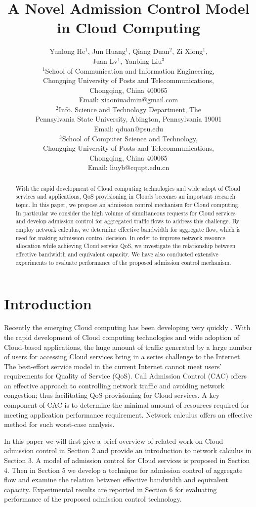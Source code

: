 \documentclass[a4paper]{article}
\title{A Novel Admission Control Model in Cloud Computing}
\author{Yunlong He$^1$, Jun Huang$^1$, Qiang Duan$^2$, Zi Xiong$^1$,\\
       Juan Lv$^1$, Yanbing Liu$^3$\\
       $^1$School of Communication and Information Engineering,\\
        Chongqing University of Posts and Telecommunications,\\
        Chongqing, China 400065\\
       Email: xiaoniuadmin@gmail.com\\
       $^2$Info. Science and Technology Department, The\\ Pennsylvania
        State University, Abington, Pennsylvania 19001\\
       Email: qduan@psu.edu\\
       $^3$School of Computer Science and Technology,\\
        Chongqing University of Posts and Telecommunications,\\
        Chongqing, China 400065\\
       Email: liuyb@cqupt.edu.cn
}
\begin{document}
\maketitle



\begin{abstract}

With the rapid development of Cloud computing technologies and wide adopt of Cloud services and applications, QoS provisioning in Clouds becomes an important research topic. In this paper, we propose an admission control mechanism for Cloud computing. In particular we consider the high volume of simultaneous requests for Cloud services and develop admission control for aggregated traffic flows to address this challenge. By employ network calculus, we determine effective bandwidth for aggregate flow, which is used for making admission control decision. In order to improve network resource allocation while achieving Cloud service QoS, we investigate the relationship between effective bandwidth and equivalent capacity. We have also conducted extensive experiments to evaluate performance of the proposed admission control mechanism.

\end{abstract}

\section{Introduction}

Recently the emerging Cloud computing has been developing very quickly \cite{mishra2013, armbrust2010, ashraf2013}. With the rapid development of Cloud computing technologies and wide adoption of Cloud-based applications, the huge amount of traffic generated by a large number of users for accessing Cloud services bring in a series challenge to the Internet. The best-effort service model in the current Internet cannot meet users’ requirements for Quality of Service (QoS). Call Admission Control (CAC) offers an effective approach to controlling network traffic and avoiding network congestion; thus facilitating QoS provisioning for Cloud services. A key component of CAC is to determine the minimal amount of resources required for meeting application performance requirement. Network calculus offers an effective method for such worst-case analysis.

In this paper we will first give a brief overview of related work on Cloud admission control in Section 2 and provide an introduction to network calculus in Section 3. A model of admission control for Cloud services is proposed in Section 4. Then in Section 5 we develop a technique for admission control of aggregate flow and examine the relation between effective bandwidth and equivalent capacity. Experimental results are reported in Section 6 for evaluating performance of the proposed admission control technology.
\end{document}
